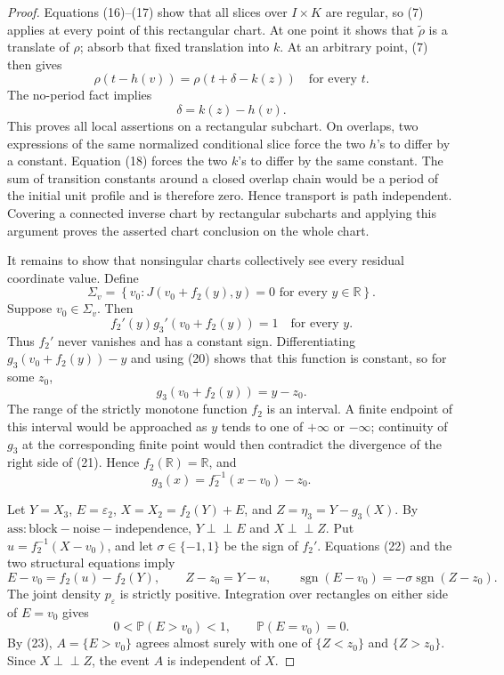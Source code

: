 \documentclass{article}
\begin{document}
\begin{proof}
Equations (16)--(17) show that all slices over \(I\times K\) are regular, so (7) applies at every point of this rectangular chart.  At one point it shows that \(\widetilde\rho\) is a translate of \(\rho\); absorb that fixed translation into \(k\).  At an arbitrary point, (7) then gives
\[
 \rho(t-h(v))=\rho(t+\delta-k(z))\quad\text{for every }t.
\]
The no-period fact implies
\[
 \delta=k(z)-h(v).
\tag{18}
\]
This proves all local assertions on a rectangular subchart.  On overlaps, two expressions of the same normalized conditional slice force the two \(h\)'s to differ by a constant.  Equation (18) forces the two \(k\)'s to differ by the same constant.  The sum of transition constants around a closed overlap chain would be a period of the initial unit profile and is therefore zero.  Hence transport is path independent.  Covering a connected inverse chart by rectangular subcharts and applying this argument proves the asserted chart conclusion on the whole chart.

It remains to show that nonsingular charts collectively see every residual coordinate value.  Define
\[
 \Sigma_v=\left\{v_0:J(v_0+f_2(y),y)=0\text{ for every }y\in\mathbb R\right\}.
\tag{19}
\]
Suppose \(v_0\in\Sigma_v\).  Then
\[
 f_2'(y)g_3'(v_0+f_2(y))=1\quad\text{for every }y.
\tag{20}
\]
Thus \(f_2'\) never vanishes and has a constant sign.  Differentiating \(g_3(v_0+f_2(y))-y\) and using (20) shows that this function is constant, so for some \(z_0\),
\[
 g_3(v_0+f_2(y))=y-z_0.
\tag{21}
\]
The range of the strictly monotone function \(f_2\) is an interval.  A finite endpoint of this interval would be approached as \(y\) tends to one of \(+\infty\) or \(-\infty\); continuity of \(g_3\) at the corresponding finite point would then contradict the divergence of the right side of (21).  Hence \(f_2(\mathbb R)=\mathbb R\), and
\[
 g_3(x)=f_2^{-1}(x-v_0)-z_0.
\tag{22}
\]

Let \(Y=X_3\), \(E=\varepsilon_2\), \(X=X_2=f_2(Y)+E\), and \(Z=\eta_3=Y-g_3(X)\).  By \(\mathrm{ass:block-noise-independence}\), \(Y\perp\!\!\!\perp E\) and \(X\perp\!\!\!\perp Z\).  Put \(u=f_2^{-1}(X-v_0)\), and let \(\sigma\in\{-1,1\}\) be the sign of \(f_2'\).  Equations (22) and the two structural equations imply
\[
 E-v_0=f_2(u)-f_2(Y),
 \qquad Z-z_0=Y-u,
 \qquad \operatorname{sgn}(E-v_0)=-\sigma\operatorname{sgn}(Z-z_0).
\tag{23}
\]
The joint density \(p_\varepsilon\) is strictly positive.  Integration over rectangles on either side of \(E=v_0\) gives
\[
 0<\mathbb P(E>v_0)<1,
 \qquad \mathbb P(E=v_0)=0.
\tag{24}
\]
By (23), \(A=\{E>v_0\}\) agrees almost surely with one of \(\{Z<z_0\}\) and \(\{Z>z_0\}\).  Since \(X\perp\!\!\!\perp Z\), the event \(A\) is independent of \(X\).


\end{proof}
\end{document}
